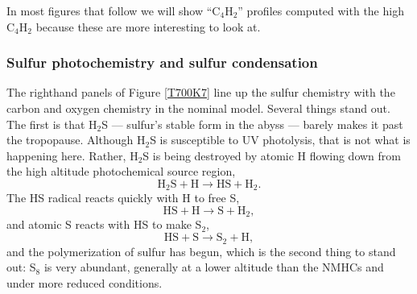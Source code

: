 \documentclass[preprint]{aastex}
\begin{document}
In most figures that follow we will show ``C$_4$H$_2$'' profiles computed with the high C$_4$H$_2$ 
because these are more interesting to look at.

\subsubsection{Sulfur photochemistry and sulfur condensation}

The righthand panels of Figure \ref{T700K7} line up the sulfur chemistry with the carbon and oxygen chemistry
in the nominal model.
Several things stand out.  The first is that H$_2$S --- sulfur's stable form in the abyss --- barely makes it past the
tropopause.  Although H$_2$S is susceptible to UV photolysis, that is not what is happening here.
Rather, H$_2$S is being destroyed by atomic H flowing down from the high altitude photochemical source region,
\begin{equation}  \tag{R23}
 \mathrm{H}_2\mathrm{S} + \mathrm{H} \rightarrow  \mathrm{HS} + \mathrm{H}_2    .
\end{equation} 
The HS radical reacts quickly with H to free S, 
\begin{equation}  \tag{R9}
 \mathrm{HS} + \mathrm{H} \rightarrow  \mathrm{S} + \mathrm{H}_2    ,
\end{equation} 
and atomic S reacts with HS to make S$_2$,
\begin{equation}  \tag{R8}
 \mathrm{HS} + \mathrm{S} \rightarrow  \mathrm{S}_2 + \mathrm{H}   , 
\end{equation} 
and the polymerization of sulfur has begun, which is the 
second thing to stand out: S$_8$ is very abundant, generally
at a lower altitude than the NMHCs and under more reduced conditions.
\end{document}
